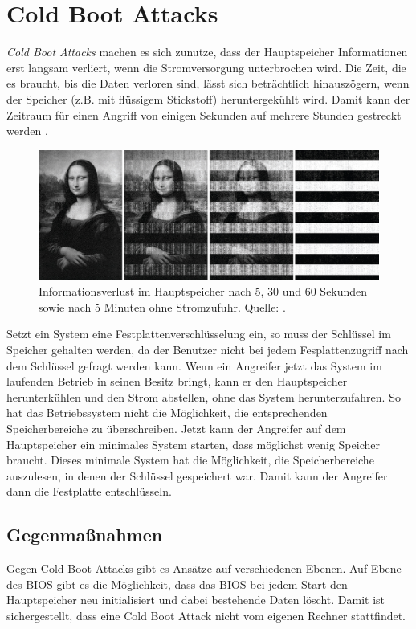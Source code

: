 \section{Cold Boot Attacks}
\emph{Cold Boot Attacks} machen es sich zunutze, dass der Hauptspeicher
Informationen erst langsam verliert, wenn die Stromversorgung
unterbrochen wird. Die Zeit, die es braucht, bis die Daten verloren
sind, lässt sich beträchtlich hinauszögern, wenn der Speicher (z.B. mit
flüssigem Stickstoff) heruntergekühlt wird. Damit kann der Zeitraum für
einen Angriff von einigen Sekunden auf mehrere Stunden gestreckt werden
\cite{Halderman08}.

\begin{figure}[h]
  \centering
  \includegraphics[width=\textwidth]{images/mona-lisa.jpg}
  \caption{Informationsverlust im Hauptspeicher nach 5, 30 und 60 Sekunden sowie nach 5
    Minuten ohne Stromzufuhr. Quelle: \cite{Halderman08}.}
  \label{fig:mona-lisa}
\end{figure}

Setzt ein System eine Festplattenverschlüsselung ein, so muss der
Schlüssel im Speicher gehalten werden, da der Benutzer nicht bei jedem
Fesplattenzugriff nach dem Schlüssel gefragt werden kann. Wenn ein
Angreifer jetzt das System im laufenden Betrieb in seinen Besitz bringt,
kann er den Hauptspeicher herunterkühlen und den Strom abstellen, ohne
das System herunterzufahren. So hat das Betriebssystem nicht die
Möglichkeit, die entsprechenden Speicherbereiche zu überschreiben. Jetzt
kann der Angreifer auf dem Hauptspeicher ein minimales System starten,
dass möglichst wenig Speicher braucht. Dieses minimale System hat die
Möglichkeit, die Speicherbereiche auszulesen, in denen der Schlüssel
gespeichert war. Damit kann der Angreifer dann die Festplatte
entschlüsseln.

\subsection{Gegenmaßnahmen}
Gegen Cold Boot Attacks gibt es Ansätze auf verschiedenen Ebenen. Auf
Ebene des BIOS gibt es die Möglichkeit, dass das BIOS bei jedem Start
den Hauptspeicher neu initialisiert und dabei bestehende Daten
löscht. Damit ist sichergestellt, dass eine Cold Boot Attack nicht vom
eigenen Rechner stattfindet.


